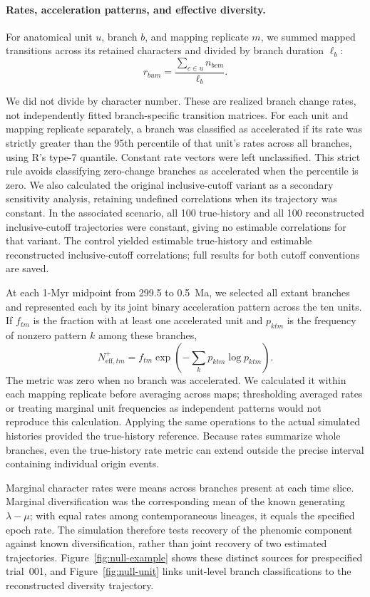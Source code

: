 \begin{samepage}
\paragraph{Rates, acceleration patterns, and effective diversity.}
For anatomical unit $u$, branch $b$, and mapping replicate $m$, we summed
mapped transitions across its retained characters and divided by branch
duration $\ell_b$:
\[
  r_{bum}=\frac{\sum_{c\in u}n_{bcm}}{\ell_b}.
\]
\end{samepage}
We did not divide by character number. These are realized branch change
rates, not independently fitted branch-specific transition matrices.
For each unit and mapping replicate separately, a branch was classified as
accelerated if its rate was strictly greater than the 95th percentile of
that unit's rates across all branches, using R's type-7 quantile.
Constant rate vectors were left unclassified. This strict rule avoids
classifying zero-change branches as accelerated when the percentile is zero.
We also calculated the original inclusive-cutoff variant as a secondary
sensitivity analysis, retaining undefined correlations when its trajectory
was constant. In the associated scenario, all 100 true-history and all 100 reconstructed
inclusive-cutoff trajectories were constant, giving no estimable correlations
for that variant. The control yielded \NullInclusiveTruth{} estimable true-history
and \NullInclusiveReconstructed{} estimable reconstructed inclusive-cutoff
correlations; full results for both cutoff conventions are saved.

At each 1-Myr midpoint from 299.5 to 0.5~Ma, we selected all extant branches
and represented each by its joint binary acceleration pattern across the
ten units. If $f_{tm}$ is the fraction with at least one accelerated unit and
$p_{ktm}$ is the frequency of nonzero pattern $k$ among these branches,
\[
  N_{\mathrm{eff},tm}^{+}
  = f_{tm}\exp\left(-\sum_k p_{ktm}\log p_{ktm}\right).
\]
The metric was zero when no branch was accelerated. We calculated it within
each mapping replicate before averaging across maps; thresholding averaged
rates or treating marginal unit frequencies as independent patterns would
not reproduce this calculation. Applying the same operations to the actual
simulated histories provided the true-history reference.
Because rates summarize whole branches, even the true-history rate metric
can extend outside the precise interval containing individual origin events.

Marginal character rates were means across branches present at each time
slice. Marginal diversification was the corresponding mean of the known
generating $\lambda-\mu$; with equal rates among contemporaneous lineages,
it equals the specified epoch rate. The simulation therefore tests recovery
of the phenomic component against known diversification, rather than joint
recovery of two estimated trajectories. Figure~\ref{fig:null-example} shows
these distinct sources for prespecified trial~001, and
Figure~\ref{fig:null-unit} links unit-level branch classifications to the
reconstructed diversity trajectory.

